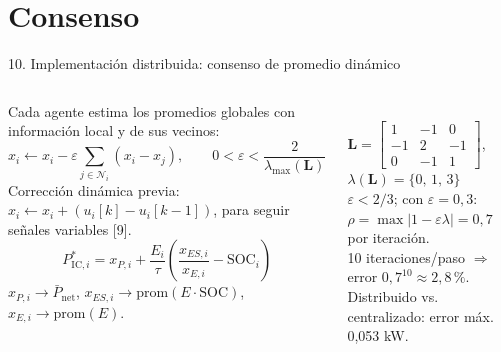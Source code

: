 \documentclass[aspectratio=169,11pt]{beamer}
\newcommand{\Picr}[1]{P^{*}_{\mathrm{IC},#1}}
\newcommand{\Pnetm}{\bar P_{\mathrm{net}}}
\newcommand{\SOC}[1]{\mathrm{SOC}_{#1}}
\begin{document}
\section{Consenso}
\begin{frame}{10. Implementación distribuida: consenso de promedio dinámico}
  \begin{columns}[T]
    Cada agente estima los promedios globales con información local y de sus vecinos:
    \begin{equation}
      x_i \leftarrow x_i-\varepsilon\sum_{j\in\mathcal N_i}(x_i-x_j),\qquad 0<\varepsilon<\frac{2}{\lambda_{\max}(\bm L)}
    \end{equation}
    {\footnotesize Corrección dinámica previa: $x_i\leftarrow x_i + (u_i[k]-u_i[k-1])$, para seguir señales variables [9].}
    \begin{equation*}
      \Picr{i}=x_{P,i}+\frac{E_i}{\tau}\left(\frac{x_{ES,i}}{x_{E,i}}-\SOC{i}\right)
    \end{equation*}
    {\footnotesize $x_{P,i}\to\Pnetm$, \; $x_{ES,i}\to\mathrm{prom}(E\cdot\mathrm{SOC})$, \; $x_{E,i}\to\mathrm{prom}(E)$.}
    \centering
    \\[4pt]
    \footnotesize
    $\bm L=\begin{bmatrix}1&-1&0\\-1&2&-1\\0&-1&1\end{bmatrix}$, \quad $\lambda(\bm L)=\{0,\,1,\,3\}$\\[4pt]
    $\varepsilon<2/3$; con $\varepsilon=0{,}3$: $\rho=\max|1-\varepsilon\lambda|=0{,}7$ por iteración.\\[3pt]
    10 iteraciones/paso $\Rightarrow$ error $0{,}7^{10}\approx2{,}8\,\%$.\\[3pt]
    \alert{Distribuido vs. centralizado: error máx. 0{,}053 kW.}
  \end{columns}
\end{frame}
\end{document}
